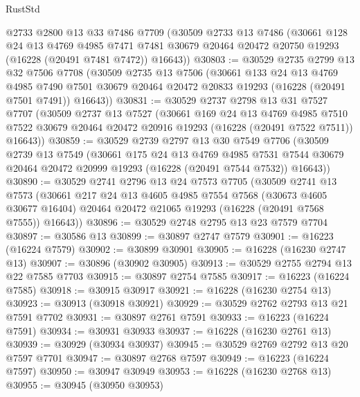 \begin{lexlean}{RustStd}
\begin{coremodule}
    @2733
    @2800
    @13
    @33
    @7486
    @7709
    (@30509
      @2733
      @13
      @7486
      (@30661
        @128
        @24
        @13
        @4769
        @4985
        @7471
        @7481
        @30679
        @20464
        @20472
        @20750
        @19293
        (@16228 (@20491 @7481 @7472))
        @16643))
@30803 := @30529
    @2735
    @2799
    @13
    @32
    @7506
    @7708
    (@30509
      @2735
      @13
      @7506
      (@30661
        @133
        @24
        @13
        @4769
        @4985
        @7490
        @7501
        @30679
        @20464
        @20472
        @20833
        @19293
        (@16228 (@20491 @7501 @7491))
        @16643))
@30831 := @30529
    @2737
    @2798
    @13
    @31
    @7527
    @7707
    (@30509
      @2737
      @13
      @7527
      (@30661
        @169
        @24
        @13
        @4769
        @4985
        @7510
        @7522
        @30679
        @20464
        @20472
        @20916
        @19293
        (@16228 (@20491 @7522 @7511))
        @16643))
@30859 := @30529
    @2739
    @2797
    @13
    @30
    @7549
    @7706
    (@30509
      @2739
      @13
      @7549
      (@30661
        @175
        @24
        @13
        @4769
        @4985
        @7531
        @7544
        @30679
        @20464
        @20472
        @20999
        @19293
        (@16228 (@20491 @7544 @7532))
        @16643))
@30890 := @30529
    @2741
    @2796
    @13
    @24
    @7573
    @7705
    (@30509
      @2741
      @13
      @7573
      (@30661
        @217
        @24
        @13
        @4605
        @4985
        @7554
        @7568
        (@30673 @4605 @30677 @16404)
        @20464
        @20472
        @21065
        @19293
        (@16228 (@20491 @7568 @7555))
        @16643))
@30896 := @30529 @2748 @2795 @13 @23 @7579 @7704
@30897 := @30586 @13
@30899 := @30897 @2747 @7579
@30901 := @16223 (@16224 @7579)
@30902 := @30899 @30901
@30905 := @16228 (@16230 @2747 @13)
@30907 := @30896 (@30902 @30905)
@30913 := @30529 @2755 @2794 @13 @22 @7585 @7703
@30915 := @30897 @2754 @7585
@30917 := @16223 (@16224 @7585)
@30918 := @30915 @30917
@30921 := @16228 (@16230 @2754 @13)
@30923 := @30913 (@30918 @30921)
@30929 := @30529 @2762 @2793 @13 @21 @7591 @7702
@30931 := @30897 @2761 @7591
@30933 := @16223 (@16224 @7591)
@30934 := @30931 @30933
@30937 := @16228 (@16230 @2761 @13)
@30939 := @30929 (@30934 @30937)
@30945 := @30529 @2769 @2792 @13 @20 @7597 @7701
@30947 := @30897 @2768 @7597
@30949 := @16223 (@16224 @7597)
@30950 := @30947 @30949
@30953 := @16228 (@16230 @2768 @13)
@30955 := @30945 (@30950 @30953)

\end{coremodule}
\end{lexlean}
